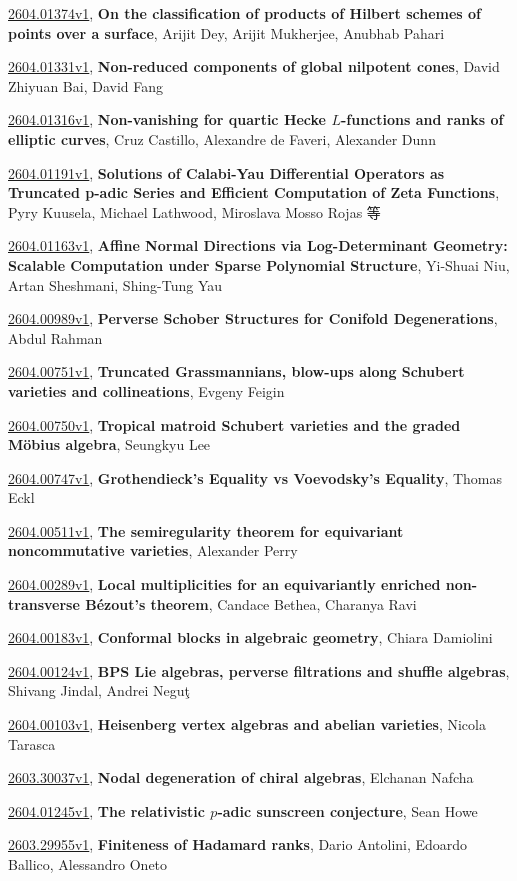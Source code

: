 \documentclass[9pt, a4paper]{article}
\theoremstyle{plain}
\theoremstyle{definition}
\theoremstyle{remark}
\newcommand{\arxiv}[3]{\href{https://arxiv.org/abs/#1}{#1}, \textbf{\textcolor{arxivblue}{#2}}, #3}
\begin{document}
\arxiv{2604.01374v1}{On the classification of products of Hilbert schemes of points over a surface}{Arijit Dey, Arijit Mukherjee, Anubhab Pahari}

\arxiv{2604.01331v1}{Non-reduced components of global nilpotent cones}{David Zhiyuan Bai, David Fang}

\arxiv{2604.01316v1}{Non-vanishing for quartic Hecke $L$-functions and ranks of elliptic curves}{Cruz Castillo, Alexandre de Faveri, Alexander Dunn}

\arxiv{2604.01191v1}{Solutions of Calabi-Yau Differential Operators as Truncated p-adic Series and Efficient Computation of Zeta Functions}{Pyry Kuusela, Michael Lathwood, Miroslava Mosso Rojas 等}

\arxiv{2604.01163v1}{Affine Normal Directions via Log-Determinant Geometry: Scalable Computation under Sparse Polynomial Structure}{Yi-Shuai Niu, Artan Sheshmani, Shing-Tung Yau}

\arxiv{2604.00989v1}{Perverse Schober Structures for Conifold Degenerations}{Abdul Rahman}

\arxiv{2604.00751v1}{Truncated Grassmannians, blow-ups along Schubert varieties and collineations}{Evgeny Feigin}

\arxiv{2604.00750v1}{Tropical matroid Schubert varieties and the graded Möbius algebra}{Seungkyu Lee}

\arxiv{2604.00747v1}{Grothendieck's Equality vs Voevodsky's Equality}{Thomas Eckl}

\arxiv{2604.00511v1}{The semiregularity theorem for equivariant noncommutative varieties}{Alexander Perry}

\arxiv{2604.00289v1}{Local multiplicities for an equivariantly enriched non-transverse Bézout's theorem}{Candace Bethea, Charanya Ravi}

\arxiv{2604.00183v1}{Conformal blocks in algebraic geometry}{Chiara Damiolini}

\arxiv{2604.00124v1}{BPS Lie algebras, perverse filtrations and shuffle algebras}{Shivang Jindal, Andrei Neguţ}

\arxiv{2604.00103v1}{Heisenberg vertex algebras and abelian varieties}{Nicola Tarasca}

\arxiv{2603.30037v1}{Nodal degeneration of chiral algebras}{Elchanan Nafcha}

\arxiv{2604.01245v1}{The relativistic $p$-adic sunscreen conjecture}{Sean Howe}

\arxiv{2603.29955v1}{Finiteness of Hadamard ranks}{Dario Antolini, Edoardo Ballico, Alessandro Oneto}
\end{document}
